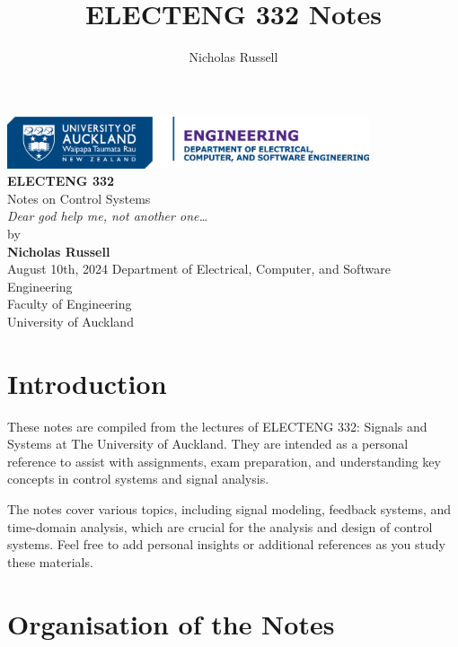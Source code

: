 \documentclass[
  12pt,
  a4paper,
]{report}
\title{ELECTENG 332 Notes}
\author{Nicholas Russell}
\author{}
\date{}
\renewcommand*\contentsname{Table of contents}
\newcommand\contentsname{Table of contents}
\begin{document}
\begin{titlepage}
    \centering
    \includegraphics[width=0.8\textwidth]{images/DECSE-HC-4C-01.png}\\[1cm]
    {\LARGE \textbf{ELECTENG 332}}\\[0.5cm]
    {\Large Notes on Control Systems}\\[0.5cm]
    {\textit{Dear god help me, not another one\dots\ }}\\[2cm]
    {\large by}\\[0.3cm]
    {\large \textbf{Nicholas Russell}}\\[1.4cm]
    {\large August 10th, 2024}
    \vfill
    {\large Department of Electrical, Computer, and Software Engineering}\\[0.3cm]
    {\large Faculty of Engineering}\\[0.3cm]
    {\large University of Auckland}
\end{titlepage}

\renewcommand*\contentsname{Table of contents}
{
\hypersetup{linkcolor=}
\setcounter{tocdepth}{2}
\tableofcontents
}


\chapter*{Introduction}\label{introduction}


These notes are compiled from the lectures of ELECTENG 332: Signals and
Systems at The University of Auckland. They are intended as a personal
reference to assist with assignments, exam preparation, and
understanding key concepts in control systems and signal analysis.

The notes cover various topics, including signal modeling, feedback
systems, and time-domain analysis, which are crucial for the analysis
and design of control systems. Feel free to add personal insights or
additional references as you study these materials.


\chapter*{Organisation of the Notes}\label{organisation-of-the-notes}
\end{document}
